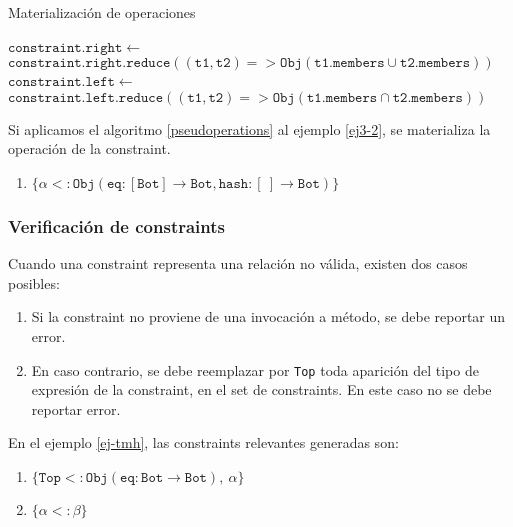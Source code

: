 \begin{algorithm}\captionsetup{labelsep=newline}
  \centering
  \caption{Materialización de operaciones}
  \label{pseudoperations}
    \begin{algorithmic}[1]
              \State $\mathtt{constraint.right\gets}$
              \State \ \ \ \ \ \ \ \ \ $\mathtt{constraint.right.reduce((t1,t2) => Obj(t1.members \cup t2.members))}$
            \EndIf
              \State $\mathtt{constraint.left\gets}$
              \State \ \ \ \ \ \ \ \ \ $\mathtt{constraint.left.reduce((t1,t2) => Obj(t1.members \cap t2.members))}$
            \EndIf
          \EndFor
      \EndFunction
    \end{algorithmic}
\end{algorithm}

Si aplicamos el algoritmo \ref{pseudoperations} al ejemplo \ref{ej3-2}, se materializa la operación de la constraint.

\begin{enumerate}
  \item $\mathtt{\{\alpha <: Obj(eq : [Bot] \rightarrow Bot, hash : [\ ] \rightarrow Bot)\}}$
\end{enumerate}

\subsubsection{Verificación de constraints}
Cuando una constraint representa una relación no válida, existen dos casos posibles:

\begin{enumerate}
  \item Si la constraint no proviene de una invocación a método, se debe reportar un error.
  \item En caso contrario, se debe reemplazar por \texttt{Top} toda aparición del tipo de expresión de la constraint, en el set de constraints. En este caso no se debe reportar error.
\end{enumerate}

En el ejemplo \ref{ej-tmh}, las constraints relevantes generadas son:

\begin{enumerate}
  \item $\{\mathtt{Top <: Obj(eq: Bot \rightarrow Bot),\ \alpha}\}$
  \item $\{\mathtt{\alpha <: \beta}\}$
\end{enumerate}

